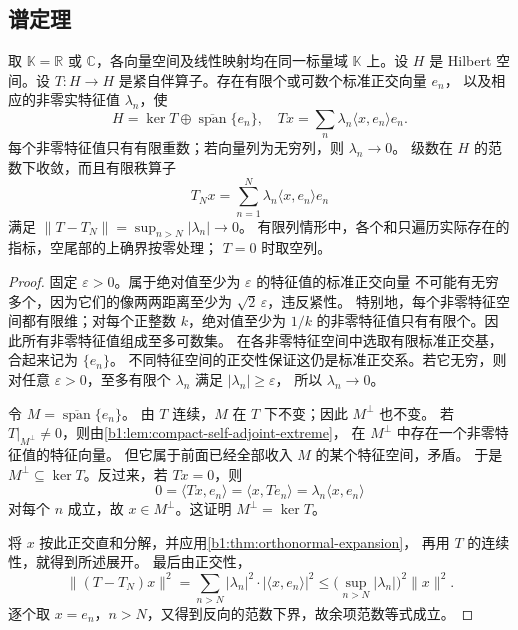 \subsection{谱定理}
\label{b1:subsec:080503}

\begin{theorem}[紧自伴谱定理]
\label{b1:thm:compact-self-adjoint-spectral}
取 \(\mathbb K=\mathbb R\) 或 \(\mathbb C\)，各向量空间及线性映射均在同一标量域 \(\mathbb K\) 上。设 \(H\) 是 Hilbert 空间。设 \(T:H\to H\) 是紧自伴算子。存在有限个或可数个标准正交向量 \(e_n\)，
以及相应的非零实特征值 \(\lambda_n\)，使
\[
 H=\ker T\oplus\overline{\operatorname{span}}\{e_n\},\quad
 Tx=\sum_n\lambda_n\langle x,e_n\rangle e_n.
\]
每个非零特征值只有有限重数；若向量列为无穷列，则 \(\lambda_n\to0\)。
级数在 \(H\) 的范数下收敛，而且有限秩算子
\[
 T_Nx=\sum_{n=1}^N\lambda_n\langle x,e_n\rangle e_n
\]
满足 \(\|T-T_N\|=\sup_{n>N}|\lambda_n|\to0\)。
有限列情形中，各个和只遍历实际存在的指标，空尾部的上确界按零处理；
\(T=0\) 时取空列。
\end{theorem}

\begin{proof}
固定 \(\varepsilon>0\)。属于绝对值至少为 \(\varepsilon\) 的特征值的标准正交向量
不可能有无穷多个，因为它们的像两两距离至少为 \(\sqrt2\,\varepsilon\)，违反紧性。
特别地，每个非零特征空间都有限维；对每个正整数 \(k\)，绝对值至少为 \(1/k\)
的非零特征值只有有限个。因此所有非零特征值组成至多可数集。
在各非零特征空间中选取有限标准正交基，合起来记为 \(\{e_n\}\)。
不同特征空间的正交性保证这仍是标准正交系。若它无穷，则对任意%
\(\varepsilon>0\)，至多有限个 \(\lambda_n\) 满足 \(|\lambda_n|\geq\varepsilon\)，
所以 \(\lambda_n\to0\)。

令 \(M=\overline{\operatorname{span}}\{e_n\}\)。
由 \(T\) 连续，\(M\) 在 \(T\) 下不变；因此 \(M^\perp\) 也不变。
若 \(T|_{M^\perp}\ne0\)，则由\cref{b1:lem:compact-self-adjoint-extreme}，
在 \(M^\perp\) 中存在一个非零特征值的特征向量。
但它属于前面已经全部收入 \(M\) 的某个特征空间，矛盾。
于是 \(M^\perp\subseteq\ker T\)。反过来，若 \(Tx=0\)，则
\[
 0=\langle Tx,e_n\rangle=\langle x,Te_n\rangle
   =\lambda_n\langle x,e_n\rangle
\]
对每个 \(n\) 成立，故 \(x\in M^\perp\)。这证明 \(M^\perp=\ker T\)。

将 \(x\) 按此正交直和分解，并应用\cref{b1:thm:orthonormal-expansion}，
再用 \(T\) 的连续性，就得到所述展开。
最后由正交性，
\[
 \|(T-T_N)x\|^2
 =\sum_{n>N}|\lambda_n|^2\cdot|\langle x,e_n\rangle|^2
 \leq\bigl(\sup_{n>N}|\lambda_n|\bigr)^2\|x\|^2.
\]
逐个取 \(x=e_n\)，\(n>N\)，又得到反向的范数下界，故余项范数等式成立。
\end{proof}

